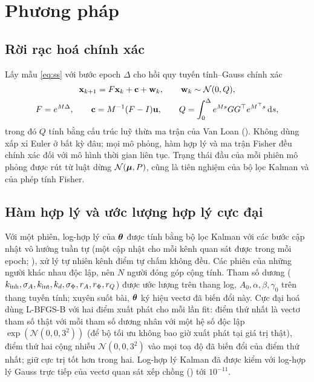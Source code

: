 \section{Phương pháp}
\label{sec:methods}

\subsection{Rời rạc hoá chính xác}
\label{sec:disc}

Lấy mẫu \eqref{eq:ss} với bước epoch $\Delta$ cho hồi quy tuyến tính--Gauss chính xác
\begin{equation}
\begin{gathered}
  \mathbf{x}_{k+1}=F\mathbf{x}_k+\mathbf c+\mathbf w_k,\qquad \mathbf w_k\sim\mathcal N(0,Q),\\
  F=e^{M\Delta},\qquad \mathbf c=M^{-1}(F-I)\mathbf{u},\qquad Q=\int_0^\Delta e^{Ms}GG^\top e^{M^\top s}\,\mathrm{d} s,
\end{gathered}
  \label{eq:disc}
\end{equation}
trong đó $Q$ tính bằng cấu trúc luỹ thừa ma trận của Van Loan \citep{VanLoan1978} (). Không dùng xấp xỉ Euler ở bất kỳ đâu; mọi mô phỏng, hàm hợp lý và ma trận Fisher đều chính xác đối với mô hình thời gian liên tục. Trạng thái đầu của mỗi phiên mô phỏng được rút từ luật dừng $\mathcal N(\boldsymbol{\mu},P)$, cũng là tiên nghiệm của bộ lọc Kalman và của phép tính Fisher.

\subsection{Hàm hợp lý và ước lượng hợp lý cực đại}
\label{sec:mle}

Với một phiên, log-hợp lý của $\boldsymbol{\theta}$ được tính bằng bộ lọc Kalman \citep{Kalman1960,Harvey1989,Durbin2012} với các bước cập nhật vô hướng tuần tự (một cập nhật cho mỗi kênh quan sát được trong mỗi epoch; ), xử lý tự nhiên kênh điểm tự chấm không đều. Các phiên của những người khác nhau độc lập, nên $N$ người đóng góp cộng tính. Tham số dương ($k_{\mathrm{inh}},\sigma_{A},k_{\mathrm{int}},k_{d},\sigma_{\Phi},r_{A},r_{\Phi},r_{Q}$) được ước lượng trên thang log, $A_0,\alpha,\beta,\gamma_0$ trên thang tuyến tính; xuyên suốt bài, $\boldsymbol{\theta}$ ký hiệu vectơ đã biến đổi này. Cực đại hoá dùng L-BFGS-B \citep{Byrd1995} với hai điểm xuất phát cho mỗi lần fit: điểm thứ nhất là vectơ tham số thật với mỗi tham số dương nhân với một hệ số độc lập $\exp(\mathcal N(0,0{,}3^2))$ (để bộ tối ưu không bao giờ xuất phát tại giá trị thật), điểm thứ hai cộng nhiễu $\mathcal N(0,0{,}3^2)$ vào mọi toạ độ đã biến đổi của điểm thứ nhất; giữ cực trị tốt hơn trong hai. Log-hợp lý Kalman đã được kiểm với log-hợp lý Gauss trực tiếp của vectơ quan sát xếp chồng () tới $10^{-11}$.

